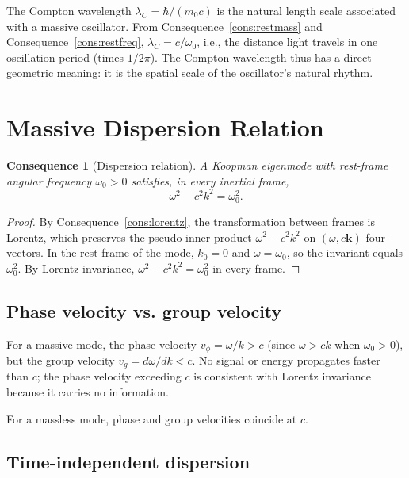 \documentclass[11pt,twocolumn,a4paper]{article}
\theoremstyle{axiomstyle}
\theoremstyle{conseqstyle}
\newtheorem{consequence}{Consequence}
\theoremstyle{definition}
\theoremstyle{remark}
\begin{document}
The Compton wavelength $\lambda_{C}=\hbar/(m_{0}c)$ is the natural length scale associated with a massive oscillator. From Consequence~\ref{cons:restmass} and Consequence~\ref{cons:restfreq}, $\lambda_{C}=c/\omega_{0}$, i.e., the distance light travels in one oscillation period (times $1/2\pi$). The Compton wavelength thus has a direct geometric meaning: it is the spatial scale of the oscillator's natural rhythm.

\section{Massive Dispersion Relation}
\label{sec:dispersion}

\begin{consequence}[Dispersion relation]
\label{cons:dispersion}
A Koopman eigenmode with rest-frame angular frequency $\omega_{0}>0$ satisfies, in every inertial frame,
\begin{equation}
\omega^{2}-c^{2}k^{2}=\omega_{0}^{2}.
\label{eq:dispersion}
\end{equation}
\end{consequence}

\begin{proof}
By Consequence~\ref{cons:lorentz}, the transformation between frames is Lorentz, which preserves the pseudo-inner product $\omega^{2}-c^{2}k^{2}$ on $(\omega,c\mathbf{k})$ four-vectors. In the rest frame of the mode, $k_{0}=0$ and $\omega=\omega_{0}$, so the invariant equals $\omega_{0}^{2}$. By Lorentz-invariance, $\omega^{2}-c^{2}k^{2}=\omega_{0}^{2}$ in every frame.
\end{proof}

\subsection{Phase velocity vs. group velocity}

For a massive mode, the phase velocity $v_{\phi}=\omega/k>c$ (since $\omega>ck$ when $\omega_{0}>0$), but the group velocity $v_{g}=d\omega/dk<c$. No signal or energy propagates faster than $c$; the phase velocity exceeding $c$ is consistent with Lorentz invariance because it carries no information.

For a massless mode, phase and group velocities coincide at $c$.

\subsection{Time-independent dispersion}
\end{document}
